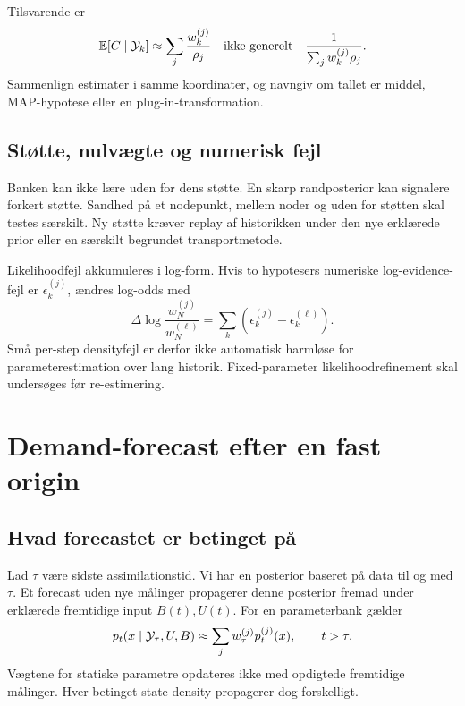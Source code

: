 Tilsvarende er
\begin{equation}
 \mathbb E[C\mid\mathcal Y_k]\approx\sum_j\frac{w_k^{(j)}}{\rho_j}
 \quad\text{ikke generelt}\quad
 \frac1{\sum_jw_k^{(j)}\rho_j}.
 \label{eq:mean_capacity}
\end{equation}
Sammenlign estimater i samme koordinater, og navngiv om tallet er middel, MAP-hypotese eller en plug-in-transformation.

\subsection{Støtte, nulvægte og numerisk fejl}
Banken kan ikke lære uden for dens støtte. En skarp randposterior kan signalere forkert støtte. Sandhed på et nodepunkt, mellem noder og uden for støtten skal testes særskilt. Ny støtte kræver replay af historikken under den nye erklærede prior eller en særskilt begrundet transportmetode.

Likelihoodfejl akkumuleres i log-form. Hvis to hypotesers numeriske log-evidence-fejl er \(\epsilon_k^{(j)}\), ændres log-odds med
\begin{equation}
 \Delta\log\frac{w_N^{(j)}}{w_N^{(\ell)}}
 =\sum_k\left(\epsilon_k^{(j)}-\epsilon_k^{(\ell)}\right).
 \label{eq:logoddserror}
\end{equation}
Små per-step densityfejl er derfor ikke automatisk harmløse for parameterestimation over lang historik. Fixed-parameter likelihoodrefinement skal undersøges før re-estimering.

\section{Demand-forecast efter en fast origin}
\subsection{Hvad forecastet er betinget på}
Lad \(\tau\) være sidste assimilationstid. Vi har en posterior baseret på data til og med \(\tau\). Et forecast uden nye målinger propagerer denne posterior fremad under erklærede fremtidige input \(B(t),U(t)\). For en parameterbank gælder
\begin{equation}
 p_t(x\mid\mathcal Y_\tau,U,B)\approx\sum_jw_\tau^{(j)}p_t^{(j)}(x),\qquad t>\tau.
 \label{eq:forecaststate}
\end{equation}
Vægtene for statiske parametre opdateres ikke med opdigtede fremtidige målinger. Hver betinget state-density propagerer dog forskelligt.

